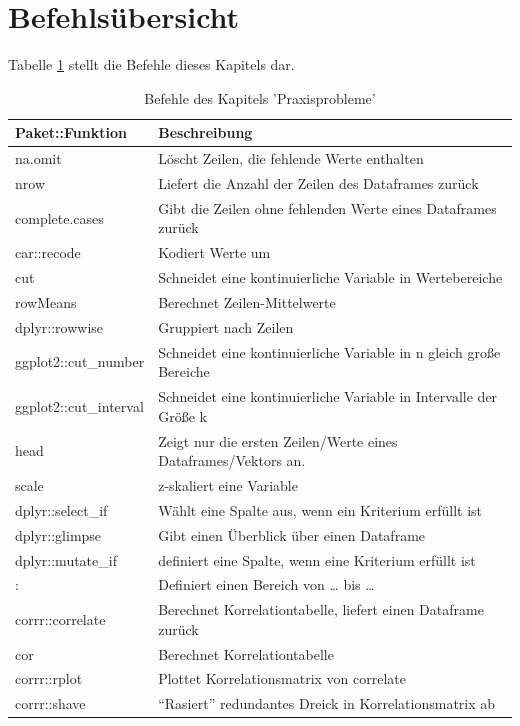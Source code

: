 \documentclass[12pt,ngerman,]{book}
\begin{document}
\section{Befehlsübersicht}\label{befehlsubersicht-3}

Tabelle \ref{tab:befehle-praxisprobleme} stellt die Befehle dieses
Kapitels dar.

\begin{table}

\caption{\label{tab:befehle-praxisprobleme}Befehle des Kapitels 'Praxisprobleme'}
\centering
\begin{tabular}[t]{l|l}
\hline
Paket::Funktion & Beschreibung\\
\hline
na.omit & Löscht Zeilen, die fehlende Werte enthalten\\
\hline
nrow & Liefert die Anzahl der Zeilen des Dataframes zurück\\
\hline
complete.cases & Gibt die Zeilen ohne fehlenden Werte eines Dataframes zurück\\
\hline
car::recode & Kodiert Werte um\\
\hline
cut & Schneidet eine kontinuierliche Variable in Wertebereiche\\
\hline
rowMeans & Berechnet Zeilen-Mittelwerte\\
\hline
dplyr::rowwise & Gruppiert nach Zeilen\\
\hline
ggplot2::cut\_number & Schneidet eine kontinuierliche Variable in n gleich große Bereiche\\
\hline
ggplot2::cut\_interval & Schneidet eine kontinuierliche Variable in Intervalle der Größe k\\
\hline
head & Zeigt nur die ersten Zeilen/Werte eines Dataframes/Vektors an.\\
\hline
scale & z-skaliert eine Variable\\
\hline
dplyr::select\_if & Wählt eine Spalte aus, wenn ein Kriterium erfüllt ist\\
\hline
dplyr::glimpse & Gibt einen Überblick über einen Dataframe\\
\hline
dplyr::mutate\_if & definiert eine Spalte, wenn eine Kriterium erfüllt ist\\
\hline
: & Definiert einen Bereich von … bis …\\
\hline
corrr::correlate & Berechnet Korrelationtabelle, liefert einen Dataframe zurück\\
\hline
cor & Berechnet Korrelationtabelle\\
\hline
corrr::rplot & Plottet Korrelationsmatrix von correlate\\
\hline
corrr::shave & “Rasiert” redundantes Dreick in Korrelationsmatrix ab\\
\hline
\end{tabular}
\end{table}
\end{document}
